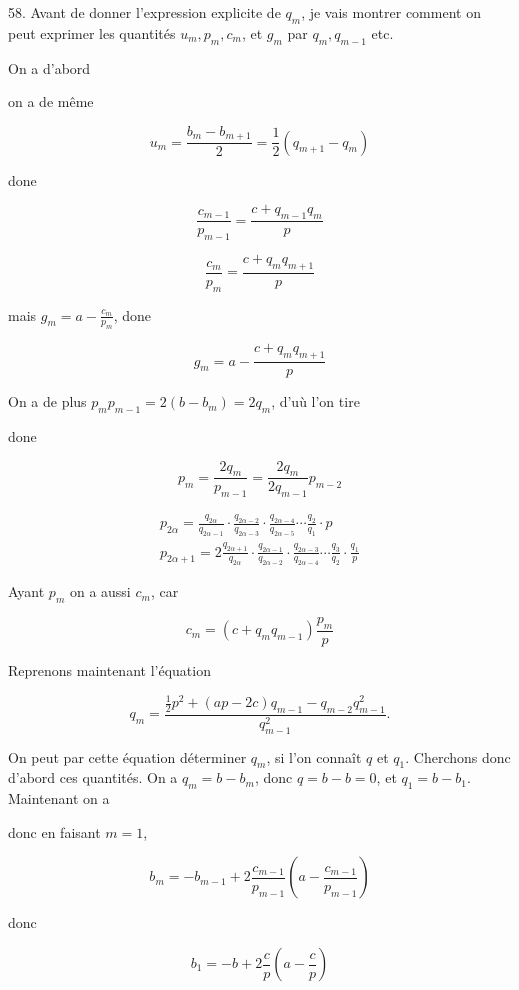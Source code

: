 \documentclass{article}
\begin{document}
58. Avant de donner l'expression explicite de \(q_{m}\), je vais montrer comment on peut exprimer les quantités \(u_{m}, p_{m}, c_{m}\), et \(g_{m}\) par \(q_{m}, q_{m-1}\) etc.

On a d'abord

on a de même

\[
u_{m}=\frac{b_{m}-b_{m+1}}{2}=\frac{1}{2}\left(q_{m+1}-q_{m}\right)
\]

done

\[
\frac{c_{m-1}}{p_{m-1}}=\frac{c+q_{m-1} q_{m}}{p}
\]

\[
\frac{c_{m}}{p_{m}}=\frac{c+q_{m} q_{m+1}}{p}
\]

mais \(g_{m}=a-\frac{c_{m}}{p_{m}}\), done

\[
g_{m}=a-\frac{c+q_{m} q_{m+1}}{p}
\]

On a de plus \(p_{m} p_{m-1}=2\left(b-b_{m}\right)=2 q_{m}\), d'uù l'on tire

done

\[
p_{m}=\frac{2 q_{m}}{p_{m-1}}=\frac{2 q_{m}}{2 q_{m-1}} p_{m-2}
\]

\[
\begin{gathered}
p_{2 \alpha}=\frac{q_{2 \alpha}}{q_{2 \alpha-1}} \cdot \frac{q_{2 \alpha-2}}{q_{2 \alpha-3}} \cdot \frac{q_{2 \alpha-4}}{q_{2 \alpha-5}} \cdots \frac{q_{2}}{q_{1}} \cdot p \\
p_{2 \alpha+1}=2 \frac{q_{2 \alpha+1}}{q_{2 \alpha}} \cdot \frac{q_{2 \alpha-1}}{q_{2 \alpha-2}} \cdot \frac{q_{2 \alpha-3}}{q_{2 \alpha-4}} \cdots \frac{q_{3}}{q_{2}} \cdot \frac{q_{1}}{p}
\end{gathered}
\]

Ayant \(p_{m}\) on a aussi \(c_{m}\), car

\[
c_{m}=\left(c+q_{m} q_{m-1}\right) \frac{p_{m}}{p}
\]

Reprenons maintenant l'équation

\[
q_{m}=\frac{\frac{1}{2} p^{2}+(a p-2 c) q_{m-1}-q_{m-2} q_{m-1}^{2}}{q_{m-1}^{2}} .
\]

On peut par cette équation déterminer \(q_{m}\), si l'on connaît \(q\) et \(q_{1}\). Cherchons donc d'abord ces quantités. On a \(q_{m}=b-b_{m}\), donc \(q=b-b=0\), et \(q_{1}=b-b_{1}\). Maintenant on a

donc en faisant \(m=1\),

\[
b_{m}=-b_{m-1}+2 \frac{c_{m-1}}{p_{m-1}}\left(a-\frac{c_{m-1}}{p_{m-1}}\right)
\]

donc

\[
b_{1}=-b+2 \frac{c}{p}\left(a-\frac{c}{p}\right)
\]
\end{document}
